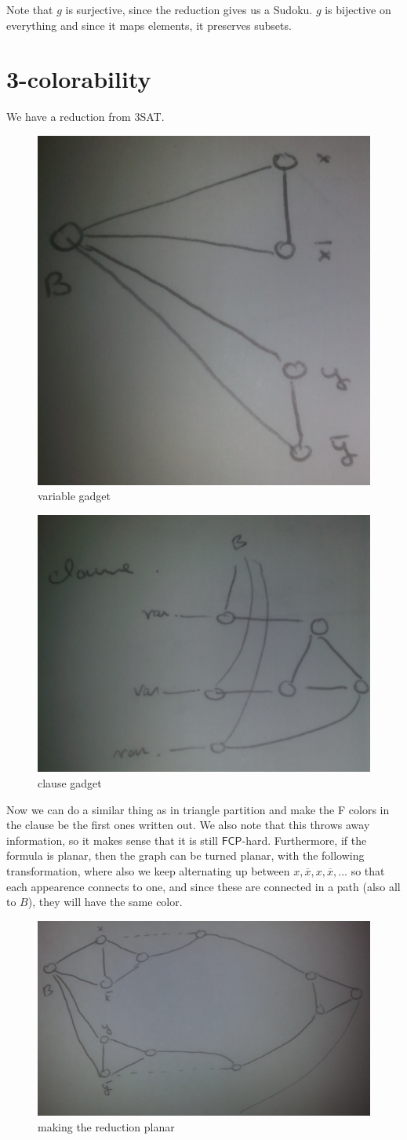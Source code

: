 \documentclass[runningheads,a4paper]{llncs}
\begin{document}
Note that $g$ is surjective, since the reduction gives us a Sudoku. $g$ is bijective on everything and since it maps elements, it preserves subsets. 

\section{3-colorability}

We have a reduction from 3SAT. 
\begin{figure}
\centering
\includegraphics[width=0.3\linewidth, angle=-90]{3colorable-var.jpg}
\caption{variable gadget}
\end{figure}

\begin{figure}
\centering
\includegraphics[width=0.3\linewidth]{3colorable-clause.jpg}
\caption{clause gadget}
\end{figure}

Now we can do a similar thing as in triangle partition and make the F colors in the clause be the first ones written out. We also note that this throws away information, so it makes sense that it is still $\mathsf{FCP}$-hard. Furthermore, if the formula is planar, then the graph can be turned planar, with the following transformation, where also we keep alternating up between $x, \overline{x}, x, \overline{x}, ... $ so that each appearence connects to one, and since these are connected in a path (also all to $B$), they will have the same color.

\begin{figure}
\centering
\includegraphics[width=0.4\linewidth]{3colorable-planar.jpg}
\caption{making the reduction planar}
\end{figure}
\end{document}

